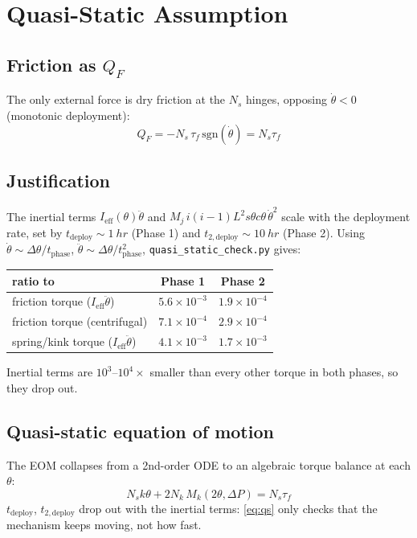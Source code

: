 \documentclass[11pt]{article}
\newcommand{\st}{s\theta}
\newcommand{\ct}{c\theta}
\newcommand{\dth}{\dot{\theta}}
\newcommand{\ddth}{\ddot{\theta}}
\newcommand{\DP}{\Delta P}
\newcommand{\Mk}{M_k}
\begin{document}
\section{Quasi-Static Assumption}

\subsection*{Friction as $Q_F$}

The only external force is dry friction at the $N_s$ hinges, opposing $\dth<0$ (monotonic deployment):
\begin{equation}
Q_F = -N_s\,\tau_f\,\mathrm{sgn}(\dth) = N_s\tau_f
\end{equation}

\subsection*{Justification}

The inertial terms $I_{\text{eff}}(\theta)\ddth$ and $M_j\,i(i-1)L^{2}\st\ct\,\dth^{2}$ scale with the
deployment rate, set by $t_{\text{deploy}}\!\sim\!\SI{1}{hr}$ (Phase 1) and
$t_{2,\text{deploy}}\!\sim\!\SI{10}{hr}$ (Phase 2). Using $\dth\sim\Delta\theta/t_{\text{phase}}$,
$\ddth\sim\Delta\theta/t_{\text{phase}}^2$, \texttt{quasi\_static\_check.py} gives:

\begin{center}
\begin{tabular}{lcc}
\toprule
ratio to & Phase 1 & Phase 2 \\
\midrule
friction torque ($I_{\text{eff}}\ddth$) & $5.6\times10^{-3}$ & $1.9\times10^{-4}$ \\
friction torque (centrifugal) & $7.1\times10^{-4}$ & $2.9\times10^{-4}$ \\
spring/kink torque ($I_{\text{eff}}\ddth$) & $4.1\times10^{-3}$ & $1.7\times10^{-3}$ \\
\bottomrule
\end{tabular}
\end{center}
Inertial terms are $10^{3}$--$10^{4}\times$ smaller than every other torque in both phases, so they
drop out.

\subsection*{Quasi-static equation of motion}

The EOM collapses from a 2nd-order ODE to an algebraic torque balance at each $\theta$:
\begin{equation}
\boxed{
N_s k\theta + 2N_k\,\Mk(2\theta,\DP) = N_s\tau_f
}
\label{eq:qs}
\end{equation}
$t_{\text{deploy}}$, $t_{2,\text{deploy}}$ drop out with the inertial terms: \eqref{eq:qs} only checks
that the mechanism keeps moving, not how fast.
\end{document}

